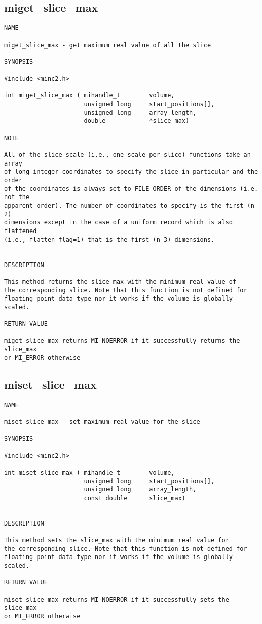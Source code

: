 \documentclass{article}
\begin{document}
\subsection{miget\_slice\_max}
\begin{verbatim}
NAME 

miget_slice_max - get maximum real value of all the slice

SYNOPSIS

#include <minc2.h>

int miget_slice_max ( mihandle_t        volume,
                      unsigned long     start_positions[],
                      unsigned long     array_length,
                      double            *slice_max)
                       
NOTE

All of the slice scale (i.e., one scale per slice) functions take an array
of long integer coordinates to specify the slice in particular and the order 
of the coordinates is always set to FILE ORDER of the dimensions (i.e. not the
apparent order). The number of coordinates to specify is the first (n-2) 
dimensions except in the case of a uniform record which is also flattened
(i.e., flatten_flag=1) that is the first (n-3) dimensions.                                


DESCRIPTION

This method returns the slice_max with the minimum real value of
the corresponding slice. Note that this function is not defined for
floating point data type nor it works if the volume is globally scaled.

RETURN VALUE

miget_slice_max returns MI_NOERROR if it successfully returns the slice_max
or MI_ERROR otherwise
\end{verbatim}

\subsection{miset\_slice\_max}
\begin{verbatim}
NAME 

miset_slice_max - set maximum real value for the slice

SYNOPSIS

#include <minc2.h>

int miset_slice_max ( mihandle_t        volume,
                      unsigned long     start_positions[],
                      unsigned long     array_length,
                      const double      slice_max)
                       
                                
DESCRIPTION

This method sets the slice_max with the minimum real value for
the corresponding slice. Note that this function is not defined for
floating point data type nor it works if the volume is globally scaled.

RETURN VALUE

miset_slice_max returns MI_NOERROR if it successfully sets the slice_max
or MI_ERROR otherwise
\end{verbatim}
\end{document}
